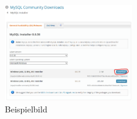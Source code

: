 \documentclass{article}
\begin{document}
\begin{figure}[h]
  \centering
  \includegraphics[width=0.5\textwidth]{screenshot.png}
  \caption{Beispielbild}
  \label{fig:beispiel}
\end{figure}
\end{document}
